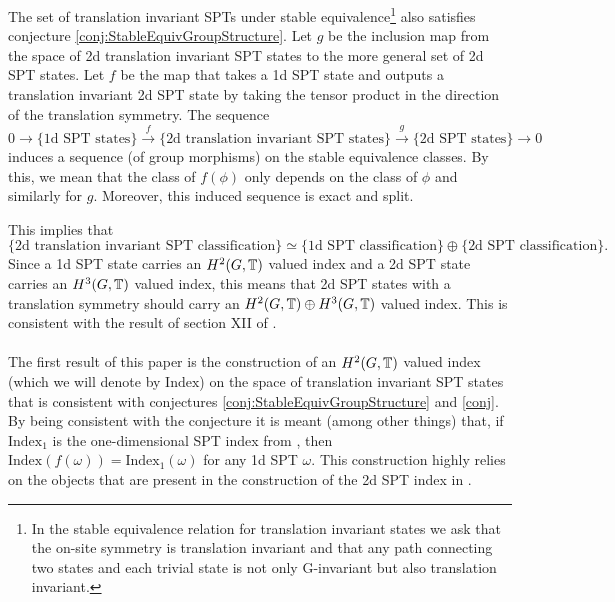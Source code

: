 \documentclass[11pt,a4paper,twoside]{article}
\numberwithin{equation}{section}
\begin{document}
	\begin{conjecture}\label{conj}
		The set of translation invariant SPTs under stable equivalence\footnote{In the stable equivalence relation for translation invariant states we ask that the on-site symmetry is translation invariant and that any path connecting two states and each trivial state is not only G-invariant but also translation invariant.} also satisfies conjecture \ref{conj:StableEquivGroupStructure}. Let $g$ be the inclusion map from the space of 2d translation invariant SPT states to the more general set of 2d SPT states. Let $f$ be the map that takes a 1d SPT state and outputs a translation invariant 2d SPT state by taking the tensor product in the direction of the translation symmetry. The sequence
		\begin{equation}
			0\rightarrow\{\text{1d SPT states}\}\stackrel{f}{\rightarrow}\{\text{2d translation invariant SPT states}\}\stackrel{g}{\rightarrow}\{\text{2d SPT states}\}\rightarrow 0
		\end{equation}
		induces a sequence (of group morphisms) on the stable equivalence classes. By this, we mean that the class of $f(\phi)$ only depends on the class of $\phi$ and similarly for $g$. Moreover, this induced sequence is exact and split.
	\end{conjecture}
	This implies that
	\begin{equation}
		\{\text{2d translation invariant SPT classification}\}\simeq \{\text{1d SPT classification}\}\oplus \{\text{2d SPT classification}\}.
	\end{equation}
	Since a 1d SPT state carries an $H^2(G,\mathbb T)$ valued index and a 2d SPT state carries an $H^3(G,\mathbb T)$ valued index, this means that 2d SPT states with a translation symmetry should carry an $H^2(G,\mathbb T)\oplus H^3(G,\mathbb T)$ valued index. This is consistent with the result of section XII of \cite{Chen_2013}.
	\\\\
	The first result of this paper is the construction of an $H^2(G,\mathbb T)$ valued index (which we will denote by $\textrm{Index}$) on the space of translation invariant SPT states that is consistent with conjectures \ref{conj:StableEquivGroupStructure} and \ref{conj}. By being consistent with the conjecture it is meant (among other things) that, if $\textrm{Index}_1$ is the one-dimensional SPT index from \cite{ogata2019classification}, then $\textrm{Index}(f(\omega))=\textrm{Index}_1(\omega)$ for any 1d SPT $\omega$. This construction highly relies on the objects that are present in the construction of the 2d SPT index in \cite{ogata2021h3gmathbb}.
\end{document}
